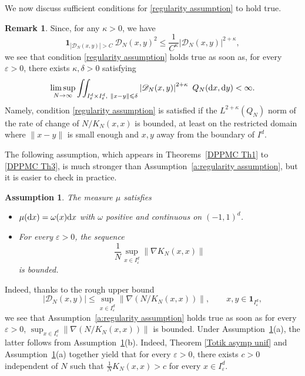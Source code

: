 \documentclass[a4paper,11pt]{article}
\numberwithin{equation}{section}
\newtheorem{assumption}{Assumption}[]
\theoremstyle{definition}
\newtheorem{Remark}[]{Remark}
\newenvironment{remark}{\begin{Remark}\rm}{\end{Remark}}
\newcommand{\rev}[1]{#1}
\newcommand{\bs}{\boldsymbol}
\newcommand{\bv}{\mathbf}
\renewcommand{\leq}{\leqslant}
\renewcommand{\epsilon}{\varepsilon}
\renewcommand{\d}{ {\rm d}}
\begin{document}
We now discuss sufficient conditions for \eqref{regularity assumption} to hold true.
\begin{remark} Since, for any $\kappa>0$, we have
$$
\bv 1_{\left|\mathscr D_{N}(x,y)\right|> C}\ \mathscr D_{N}(x,y)^2\leq \frac1{C^\kappa}\left|\mathscr D_{N}(x,y)\right|^{2+\kappa},
$$
we see that condition \eqref{regularity assumption} holds true as soon as, for every $\epsilon>0$, there exists $\kappa,\delta>0$ satisfying
$$
\limsup_{N\to\infty}\iint_{I^d_{\epsilon}\times I^d_{\epsilon},\ \|x-y\|\leq \delta} \left|\mathscr D_{N}(x,y)\right|^{2+\kappa}\  Q_N(\d x,\d y)<\infty.
$$
Namely, condition \eqref{regularity assumption} is satisfied if the
$L^{2+\kappa}(Q_N)$ norm of the rate of change of $N/K_N(x,x)$ is bounded, at
least on the restricted domain where $\|x-y\|$ is small enough and $x,y$ away
from the boundary of $I^d$.
\label{r:sufficientConditionI}
\end{remark}

The following assumption, \rev{which appears in Theorems~\ref{DPPMC Th1} to \ref{DPPMC Th3},} is much stronger than Assumption~\ref{a:regularity
  assumption}, but it is easier to check in practice.

\begin{assumption}
The measure $\mu$ satisfies
\begin{itemize}
\item[\rm{(a)}] $\mu(\d x)=\omega(x)\d x$ with $\omega$ positive and continuous on $(-1,1)^d$.
\item[\rm{(b)}] For every $\epsilon>0$, the sequence
$$
\frac1N \sup_{x\in I_\epsilon^d}\Big\|\nabla K_N(x,x)\Big\|
$$
is bounded.
\end{itemize}
\label{a:regularity assumption easy}
\end{assumption}
Indeed, thanks to the rough upper bound
$$
|\mathscr D_{N}(x,y)|\leq  \sup_{x\in I_\epsilon^d}\left\| \nabla  (N/K_N(x,x))\right\|,\qquad x,y\in\bs 1_{I_\epsilon^d},
$$
we see that Assumption~\ref{a:regularity assumption} holds true as soon
as for every $\epsilon>0$, $\sup_{x\in I_\epsilon^d}\| \nabla (N/K_N(x,x))\|$ is
bounded. Under Assumption~\ref{a:regularity assumption easy}(a),
the latter follows from Assumption~\ref{a:regularity assumption easy}(b). Indeed, Theorem
\ref{Totik asymp unif} and Assumption~\ref{a:regularity assumption easy}(a)
together yield that for every $\epsilon>0$, there exists $c>0$
independent of $N$ such that $\frac1NK_N(x,x)>c$ for every $x\in I_\epsilon^d$.
\end{document}
